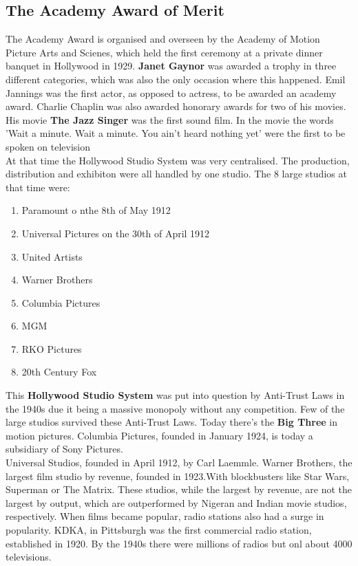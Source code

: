 \documentclass{article}
\begin{document}
	\subsection{The Academy Award of Merit}
	The Academy Award is organised and overseen by the Academy of Motion Picture Arts and Scienes, which held the first ceremony at a private dinner banquet in Hollywood in 1929. \textbf{Janet Gaynor} was awarded a trophy in three different categories, which was also the only occasion where this happened. Emil Jannings was the first actor, as opposed to actress, to be awarded an academy award. Charlie Chaplin was also awarded honorary awards for two of his movies. \\
	His movie \textbf{The Jazz Singer} was the first sound film. In the movie the words 'Wait a minute. Wait a minute. You ain't heard nothing yet' were the first to be spoken on television \\
	At that time the Hollywood Studio System was very centralised. The production, distribution and exhibiton were all handled by one studio. The 8 large studios at that time were:
	\begin{enumerate}
		\item{Paramount o nthe 8th of May 1912}
		\item{Universal Pictures on the 30th of April 1912}
		\item{United Artists}
		\item{Warner Brothers}
		\item{Columbia Pictures}
		\item{MGM}
		\item{RKO Pictures}
		\item{20th Century Fox}
	\end{enumerate}
	This \textbf{Hollywood Studio System} was put into question by Anti-Trust Laws in the 1940s due it being a massive monopoly without any competition. Few of the large studios survived these Anti-Trust Laws.
	Today there's the \textbf{Big Three} in motion pictures. Columbia Pictures, founded in January 1924, is today a subsidiary of Sony Pictures. \\
	Universal Studios, founded in April 1912, by Carl Laemmle.
	Warner Brothers, the largest film studio by revenue, founded in 1923.With blockbusters like Star Wars, Superman or The Matrix.
	These studios, while the largest by revenue, are not the largest by output, which are outperformed by Nigeran and Indian movie studios, respectively.
	When films became popular, radio stations also had a surge in popularity. KDKA, in Pittsburgh was the first commercial radio station, established in 1920. By the 1940s there were millions of radios but onl about 4000 televisions. \\
\end{document}

